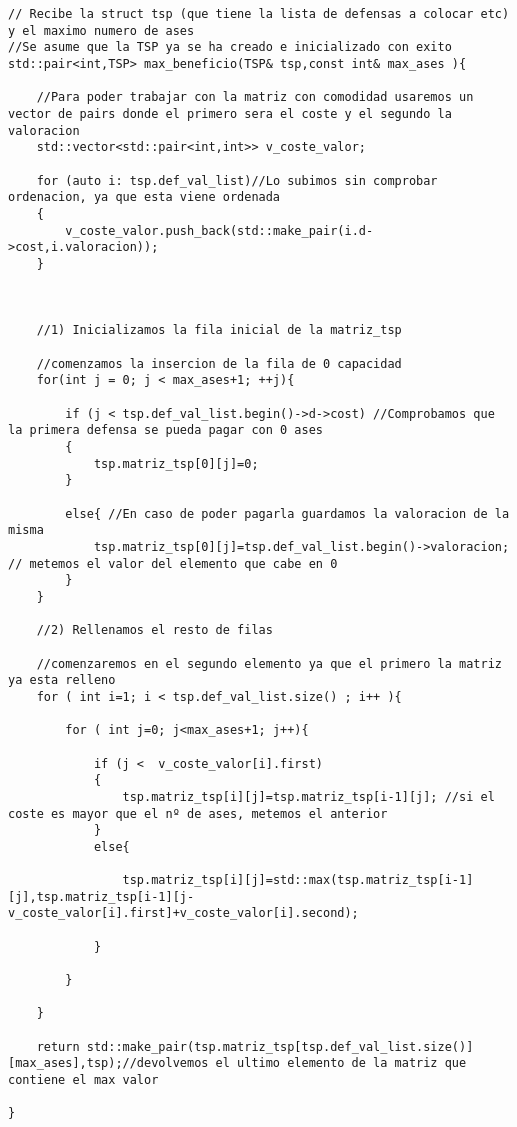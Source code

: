 \begin{lstlisting}
// Recibe la struct tsp (que tiene la lista de defensas a colocar etc) y el maximo numero de ases
//Se asume que la TSP ya se ha creado e inicializado con exito
std::pair<int,TSP> max_beneficio(TSP& tsp,const int& max_ases ){
    
    //Para poder trabajar con la matriz con comodidad usaremos un vector de pairs donde el primero sera el coste y el segundo la valoracion
    std::vector<std::pair<int,int>> v_coste_valor;

    for (auto i: tsp.def_val_list)//Lo subimos sin comprobar ordenacion, ya que esta viene ordenada
    {
        v_coste_valor.push_back(std::make_pair(i.d->cost,i.valoracion));    
    }
    


    //1) Inicializamos la fila inicial de la matriz_tsp

    //comenzamos la insercion de la fila de 0 capacidad
    for(int j = 0; j < max_ases+1; ++j){
        
        if (j < tsp.def_val_list.begin()->d->cost) //Comprobamos que la primera defensa se pueda pagar con 0 ases
        {
            tsp.matriz_tsp[0][j]=0;
        }
        
        else{ //En caso de poder pagarla guardamos la valoracion de la misma
            tsp.matriz_tsp[0][j]=tsp.def_val_list.begin()->valoracion; // metemos el valor del elemento que cabe en 0 
        }
    }
    
    //2) Rellenamos el resto de filas
    
    //comenzaremos en el segundo elemento ya que el primero la matriz ya esta relleno
    for ( int i=1; i < tsp.def_val_list.size() ; i++ ){

        for ( int j=0; j<max_ases+1; j++){
          
            if (j <  v_coste_valor[i].first)
            {
                tsp.matriz_tsp[i][j]=tsp.matriz_tsp[i-1][j]; //si el coste es mayor que el nº de ases, metemos el anterior  
            }
            else{
                
                tsp.matriz_tsp[i][j]=std::max(tsp.matriz_tsp[i-1][j],tsp.matriz_tsp[i-1][j-v_coste_valor[i].first]+v_coste_valor[i].second);
            
            }

        }
    
    }

    return std::make_pair(tsp.matriz_tsp[tsp.def_val_list.size()][max_ases],tsp);//devolvemos el ultimo elemento de la matriz que contiene el max valor

}

\end{lstlisting}